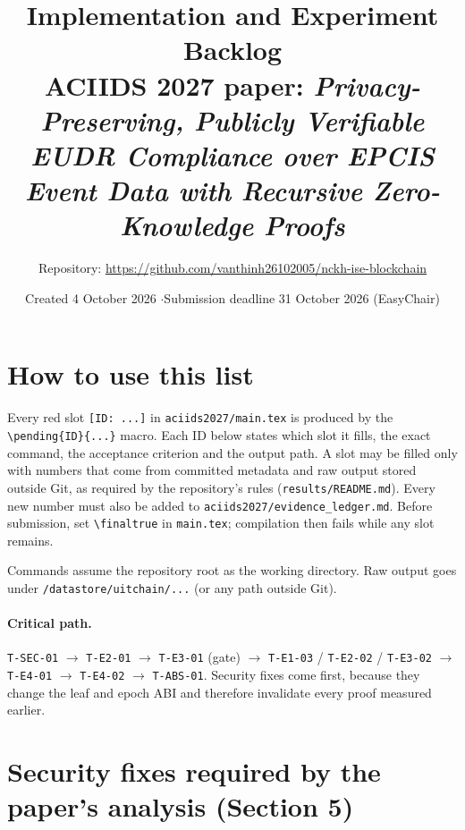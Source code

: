 \documentclass[10pt,a4paper]{article}
\title{Implementation and Experiment Backlog\\[2pt]\large ACIIDS 2027 paper: \emph{Privacy-Preserving, Publicly Verifiable EUDR Compliance over EPCIS Event Data with Recursive Zero-Knowledge Proofs}}
\author{Repository: \url{https://github.com/vanthinh26102005/nckh-ise-blockchain}}
\date{Created 4 October 2026 \quad$\cdot$\quad Submission deadline 31 October 2026 (EasyChair)}
\begin{document}
\maketitle

\section*{How to use this list}
Every red slot \texttt{[ID: ...]} in \texttt{aciids2027/main.tex} is produced by the \texttt{\textbackslash pending\{ID\}\{...\}} macro. Each ID below states which slot it fills, the exact command, the acceptance criterion and the output path. A slot may be filled only with numbers that come from committed metadata and raw output stored outside Git, as required by the repository's rules (\texttt{results/README.md}). Every new number must also be added to \texttt{aciids2027/evidence\_ledger.md}. Before submission, set \texttt{\textbackslash finaltrue} in \texttt{main.tex}; compilation then fails while any slot remains.

Commands assume the repository root as the working directory. Raw output goes under \texttt{/datastore/uitchain/...} (or any path outside Git).

\paragraph{Critical path.}
\texttt{T-SEC-01} $\rightarrow$ \texttt{T-E2-01} $\rightarrow$ \texttt{T-E3-01} (gate) $\rightarrow$ \texttt{T-E1-03} / \texttt{T-E2-02} / \texttt{T-E3-02} $\rightarrow$ \texttt{T-E4-01} $\rightarrow$ \texttt{T-E4-02} $\rightarrow$ \texttt{T-ABS-01}.
Security fixes come first, because they change the leaf and epoch ABI and therefore invalidate every proof measured earlier.

\section{Security fixes required by the paper's analysis (Section 5)}
\end{document}
